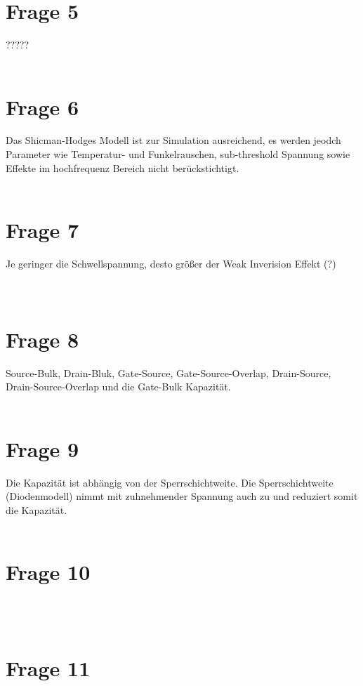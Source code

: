 \documentclass[a4paper]{scrartcl}
\begin{document}
\section*{Frage 5}
?????
~\\
~\\
\section*{Frage 6}
Das Shicman-Hodges Modell ist zur Simulation ausreichend, es werden jeodch Parameter wie Temperatur- und Funkelrauschen, sub-threshold Spannung sowie Effekte im hochfrequenz Bereich nicht berückstichtigt.
~\\
~\\
\section*{Frage 7}
Je geringer die Schwellspannung, desto größer der Weak Inverision Effekt (?)\\

~\\
~\\
\section*{Frage 8}
Source-Bulk, Drain-Bluk, Gate-Source, Gate-Source-Overlap, Drain-Source, Drain-Source-Overlap und die Gate-Bulk Kapazität.
~\\
~\\
\section*{Frage 9}
Die Kapazität ist abhängig von der Sperrschichtweite. Die Sperrschichtweite (Diodenmodell) nimmt mit zuhnehmender Spannung auch zu und reduziert somit die Kapazität.
~\\
~\\
\section*{Frage 10}

~\\
~\\
\section*{Frage 11}

~\\
~\\
\end{document}
